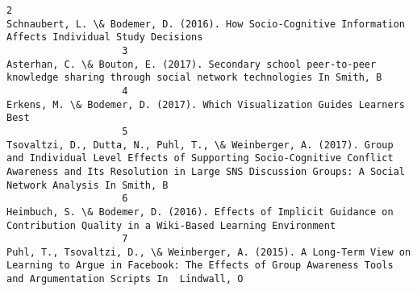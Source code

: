 \documentclass[journal,twocolumn]{IEEEtran}
\begin{document}
\begin{Verbatim}[commandchars=\\\{\}]
                    2                                                                                                                                                                                                                                                                                                                      Schnaubert, L. \& Bodemer, D. (2016). How Socio-Cognitive Information Affects Individual Study Decisions 
                    3                                                                                                                                                                                                                                                                                             Asterhan, C. \& Bouton, E. (2017). Secondary school peer-to-peer knowledge sharing through social network technologies In Smith, B
                    4                                                                                                                                                                                                                                                                                                                                                     Erkens, M. \& Bodemer, D. (2017). Which Visualization Guides Learners Best
                    5                                                                                                                                                                                     Tsovaltzi, D., Dutta, N., Puhl, T., \& Weinberger, A. (2017). Group and Individual Level Effects of Supporting Socio-Cognitive Conflict Awareness and Its Resolution in Large SNS Discussion Groups: A Social Network Analysis In Smith, B
                    6                                                                                                                                                                                                                                                                                                 Heimbuch, S. \& Bodemer, D. (2016). Effects of Implicit Guidance on Contribution Quality in a Wiki-Based Learning Environment 
                    7                                                                                                                                                                                                                                           Puhl, T., Tsovaltzi, D., \& Weinberger, A. (2015). A Long-Term View on Learning to Argue in Facebook: The Effects of Group Awareness Tools and Argumentation Scripts In  Lindwall, O

\end{Verbatim}
\end{document}
